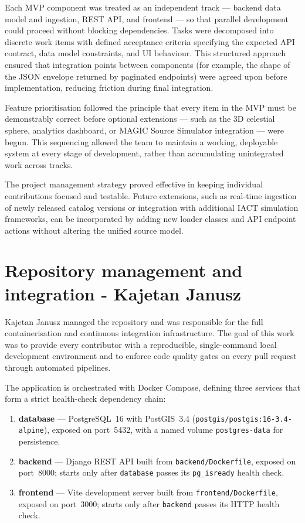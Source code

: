 \documentclass[11pt, a4paper]{article}
\begin{document}
Each MVP component was treated as an independent track — backend data model and ingestion, REST API, and frontend — so that parallel development could proceed without blocking dependencies.
Tasks were decomposed into discrete work items with defined acceptance criteria specifying the expected API contract, data model constraints, and UI behaviour.
This structured approach ensured that integration points between components (for example, the shape of the JSON envelope returned by paginated endpoints) were agreed upon before implementation, reducing friction during final integration.

Feature prioritisation followed the principle that every item in the MVP must be demonstrably correct before optional extensions — such as the 3D celestial sphere, analytics dashboard, or MAGIC Source Simulator integration — were begun.
This sequencing allowed the team to maintain a working, deployable system at every stage of development, rather than accumulating unintegrated work across tracks.

The project management strategy proved effective in keeping individual contributions focused and testable.
Future extensions, such as real-time ingestion of newly released catalog versions or integration with additional IACT simulation frameworks, can be incorporated by adding new loader classes and API endpoint actions without altering the unified source model.

\section{Repository management and integration - Kajetan Janusz}

Kajetan Janusz managed the repository and was responsible for the full containerisation and continuous integration infrastructure.
The goal of this work was to provide every contributor with a reproducible, single-command local development environment and to enforce code quality gates on every pull request through automated pipelines.

The application is orchestrated with Docker Compose, defining three services that form a strict health-check dependency chain:

\begin{enumerate}
    \item \textbf{database} — PostgreSQL~16 with PostGIS~3.4 (\texttt{postgis/postgis:16-3.4-alpine}), exposed on port~5432, with a named volume \texttt{postgres-data} for persistence.
    \item \textbf{backend} — Django REST API built from \texttt{backend/Dockerfile}, exposed on port~8000; starts only after \texttt{database} passes its \texttt{pg\_isready} health check.
    \item \textbf{frontend} — Vite development server built from \texttt{frontend/Dockerfile}, exposed on port~3000; starts only after \texttt{backend} passes its HTTP health check.
\end{enumerate}
\end{document}
